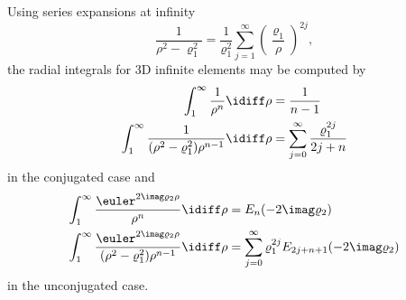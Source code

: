 Using series expansions at infinity
\begin{equation}
	\frac{1}{\rho^2-\varrho_1^2} = \frac{1}{\varrho_1^2}\sum_{j=1}^\infty \left(\frac{\varrho_1}{\rho}\right)^{2j},
\end{equation}
the radial integrals for 3D infinite elements may be computed by
\begin{align}
	\int_1^\infty \frac{1}{\rho^n}\idiff\rho &= \frac{1}{n-1}\\
	\int_1^\infty \frac{1}{(\rho^2-\varrho_1^2)\rho^{n-1}}\idiff\rho &= \sum_{j=0}^\infty \frac{\varrho_1^{2j}}{2j+n}
\end{align}
in the conjugated case and
\begin{align}
	\int_1^\infty \frac{\euler^{2\imag \varrho_2 \rho}}{\rho^n}\idiff\rho &= E_n(-2\imag \varrho_2)\\
	\int_1^\infty \frac{\euler^{2\imag \varrho_2\rho}}{(\rho^2-\varrho_1^2)\rho^{n-1}}\idiff\rho &= \sum_{j=0}^\infty \varrho_1^{2j}E_{2j+n+1}(-2\imag \varrho_2)
\end{align}
in the unconjugated case.